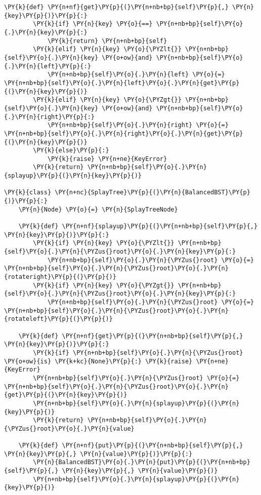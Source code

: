 \begin{Verbatim}[commandchars=\\\{\}]
    \PY{k}{def} \PY{n+nf}{get}\PY{p}{(}\PY{n+nb+bp}{self}\PY{p}{,} \PY{n}{key}\PY{p}{)}\PY{p}{:}
        \PY{k}{if} \PY{n}{key} \PY{o}{==} \PY{n+nb+bp}{self}\PY{o}{.}\PY{n}{key}\PY{p}{:}
            \PY{k}{return} \PY{n+nb+bp}{self}
        \PY{k}{elif} \PY{n}{key} \PY{o}{\PYZlt{}} \PY{n+nb+bp}{self}\PY{o}{.}\PY{n}{key} \PY{o+ow}{and} \PY{n+nb+bp}{self}\PY{o}{.}\PY{n}{left}\PY{p}{:}
            \PY{n+nb+bp}{self}\PY{o}{.}\PY{n}{left} \PY{o}{=} \PY{n+nb+bp}{self}\PY{o}{.}\PY{n}{left}\PY{o}{.}\PY{n}{get}\PY{p}{(}\PY{n}{key}\PY{p}{)}
        \PY{k}{elif} \PY{n}{key} \PY{o}{\PYZgt{}} \PY{n+nb+bp}{self}\PY{o}{.}\PY{n}{key} \PY{o+ow}{and} \PY{n+nb+bp}{self}\PY{o}{.}\PY{n}{right}\PY{p}{:}
            \PY{n+nb+bp}{self}\PY{o}{.}\PY{n}{right} \PY{o}{=} \PY{n+nb+bp}{self}\PY{o}{.}\PY{n}{right}\PY{o}{.}\PY{n}{get}\PY{p}{(}\PY{n}{key}\PY{p}{)}
        \PY{k}{else}\PY{p}{:}
            \PY{k}{raise} \PY{n+ne}{KeyError}
        \PY{k}{return} \PY{n+nb+bp}{self}\PY{o}{.}\PY{n}{splayup}\PY{p}{(}\PY{n}{key}\PY{p}{)}

\PY{k}{class} \PY{n+nc}{SplayTree}\PY{p}{(}\PY{n}{BalancedBST}\PY{p}{)}\PY{p}{:}
    \PY{n}{Node} \PY{o}{=} \PY{n}{SplayTreeNode}

    \PY{k}{def} \PY{n+nf}{splayup}\PY{p}{(}\PY{n+nb+bp}{self}\PY{p}{,} \PY{n}{key}\PY{p}{)}\PY{p}{:}
        \PY{k}{if} \PY{n}{key} \PY{o}{\PYZlt{}} \PY{n+nb+bp}{self}\PY{o}{.}\PY{n}{\PYZus{}root}\PY{o}{.}\PY{n}{key}\PY{p}{:}
            \PY{n+nb+bp}{self}\PY{o}{.}\PY{n}{\PYZus{}root} \PY{o}{=} \PY{n+nb+bp}{self}\PY{o}{.}\PY{n}{\PYZus{}root}\PY{o}{.}\PY{n}{rotateright}\PY{p}{(}\PY{p}{)}
        \PY{k}{if} \PY{n}{key} \PY{o}{\PYZgt{}} \PY{n+nb+bp}{self}\PY{o}{.}\PY{n}{\PYZus{}root}\PY{o}{.}\PY{n}{key}\PY{p}{:}
            \PY{n+nb+bp}{self}\PY{o}{.}\PY{n}{\PYZus{}root} \PY{o}{=} \PY{n+nb+bp}{self}\PY{o}{.}\PY{n}{\PYZus{}root}\PY{o}{.}\PY{n}{rotateleft}\PY{p}{(}\PY{p}{)}

    \PY{k}{def} \PY{n+nf}{get}\PY{p}{(}\PY{n+nb+bp}{self}\PY{p}{,} \PY{n}{key}\PY{p}{)}\PY{p}{:}
        \PY{k}{if} \PY{n+nb+bp}{self}\PY{o}{.}\PY{n}{\PYZus{}root} \PY{o+ow}{is} \PY{k+kc}{None}\PY{p}{:} \PY{k}{raise} \PY{n+ne}{KeyError}
        \PY{n+nb+bp}{self}\PY{o}{.}\PY{n}{\PYZus{}root} \PY{o}{=} \PY{n+nb+bp}{self}\PY{o}{.}\PY{n}{\PYZus{}root}\PY{o}{.}\PY{n}{get}\PY{p}{(}\PY{n}{key}\PY{p}{)}
        \PY{n+nb+bp}{self}\PY{o}{.}\PY{n}{splayup}\PY{p}{(}\PY{n}{key}\PY{p}{)}
        \PY{k}{return} \PY{n+nb+bp}{self}\PY{o}{.}\PY{n}{\PYZus{}root}\PY{o}{.}\PY{n}{value}

    \PY{k}{def} \PY{n+nf}{put}\PY{p}{(}\PY{n+nb+bp}{self}\PY{p}{,} \PY{n}{key}\PY{p}{,} \PY{n}{value}\PY{p}{)}\PY{p}{:}
        \PY{n}{BalancedBST}\PY{o}{.}\PY{n}{put}\PY{p}{(}\PY{n+nb+bp}{self}\PY{p}{,} \PY{n}{key}\PY{p}{,} \PY{n}{value}\PY{p}{)}
        \PY{n+nb+bp}{self}\PY{o}{.}\PY{n}{splayup}\PY{p}{(}\PY{n}{key}\PY{p}{)}
\end{Verbatim}
